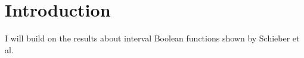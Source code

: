 \chapter*{Introduction}

I will build on the results about interval Boolean functions
shown by Schieber et al.\cite{Schieber2005154}

